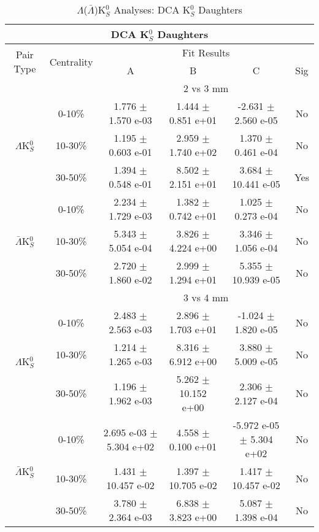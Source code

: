 \documentclass[../AnalysisNoteJBuxton.tex]{subfiles}
\begin{document}
\begin{table}
 \centering
 \begin{tabular}{|c|c|c|c|c|c|}
  \multicolumn{6}{c}{DCA K$^{0}_{S}$ Daughters} \\
  \hline
  \multirow{2}{*}{Pair Type} & \multirow{2}{*}{Centrality} & \multicolumn{4}{c|}{Fit Results} \\
  \cline{3-6}
   & & A & B & C & Sig \\  
  \hline
  \multicolumn{2}{|c}{} & \multicolumn{4}{c|}{2 vs 3 mm} \\  
  \hline  
  \multirow{3}{*}{$\Lambda$K$^{0}_{S}$}
   &  0-10\% & 1.776 $\pm$ 1.570 e-03 & 1.444 $\pm$ 0.851 e+01 & -2.631 $\pm$ 2.560 e-05 & No \\
   & 10-30\% & 1.195 $\pm$ 0.603 e-01 & 2.959 $\pm$ 1.740 e+02 & 1.370 $\pm$ 0.461 e-04 & No \\
   & 30-50\% & 1.394 $\pm$ 0.548 e-01 & 8.502 $\pm$ 2.151 e+01 & 3.684 $\pm$ 10.441 e-05 & Yes \\
  \hline
  \multirow{3}{*}{$\bar{\Lambda}$K$^{0}_{S}$}  
   &  0-10\% & 2.234 $\pm$ 1.729 e-03 & 1.382 $\pm$ 0.742 e+01 & 1.025 $\pm$ 0.273 e-04 & No \\
   & 10-30\% & 5.343 $\pm$ 5.054 e-04 & 3.826 $\pm$ 4.224 e+00 & 3.346 $\pm$ 1.056 e-04 & No \\
   & 30-50\% & 2.720 $\pm$ 1.860 e-02 & 2.999 $\pm$ 1.294 e+01 & 5.355 $\pm$ 10.939 e-05 & No \\
  \hline 
  \multicolumn{2}{|c}{} & \multicolumn{4}{c|}{3 vs 4 mm} \\
  \hline  
  \multirow{3}{*}{$\Lambda$K$^{0}_{S}$}   
   &  0-10\% & 2.483 $\pm$ 2.563 e-03 & 2.896 $\pm$ 1.703 e+01 & -1.024 $\pm$ 1.820 e-05 & No \\
   & 10-30\% & 1.214 $\pm$ 1.265 e-03 & 8.316 $\pm$ 6.912 e+00 & 3.880 $\pm$ 5.009 e-05 & No \\
   & 30-50\% & 1.196 $\pm$ 1.962 e-03 & 5.262 $\pm$ 10.152 e+00 & 2.306 $\pm$ 2.127 e-04 & No \\
  \hline  
  \multirow{3}{*}{$\bar{\Lambda}$K$^{0}_{S}$}
   &  0-10\% & 2.695 e-03 $\pm$ 5.304 e+02 & 4.558 $\pm$ 0.100 e+01 & -5.972 e-05 $\pm$ 5.304 e+02 & No \\
   & 10-30\% & 1.431 $\pm$ 10.457 e-02 & 1.397 $\pm$ 10.705 e-02 & 1.417 $\pm$ 10.457 e-02 & No \\
   & 30-50\% & 3.780 $\pm$ 2.364 e-03 & 6.838 $\pm$ 3.823 e+00 & 5.087 $\pm$ 1.398 e-04 & No \\
  \hline
 \end{tabular}
 \caption{$\Lambda$($\bar{\Lambda}$)K$^{0}_{S}$ Analyses: DCA K$^{0}_{S}$ Daughters}
 \label{tab:K0DaughtersDcaLamK0Full}
\end{table}
\end{document}
